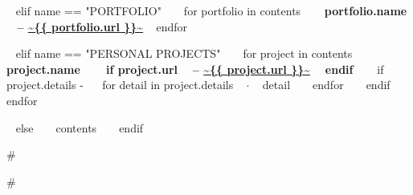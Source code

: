 \begin{minipage}{\textwidth}

~{ elif name == "PORTFOLIO" }~
  ~{ for portfolio in contents }~
    {\bf ~{{ portfolio.name }}~ -- \color{maincolor}\url{~{{ portfolio.url }}~} }
    \vspace{1mm}
  ~{ endfor }~
  \vspace{5mm}


~{ elif name == "PERSONAL PROJECTS" }~
  ~{ for project in contents }~
    {\small\bf ~{{ project.name }}~ ~{ if project.url }~ -- \color{maincolor}\url{~{{ project.url }}~} ~{ endif }~ }
    \vspace{1mm}
    ~{ if project.details -}~
    ~{ for detail in project.details }~
      $\cdot$ \small ~{{ detail }}~
    ~{ endfor }~
    ~{ endif }~
    \vspace{3mm}
  ~{ endfor }~
  \vspace{15mm}


\vspace{10mm}
~{ else }~
  ~{{ contents }}~
  \bigskip
~{ endif }~
\end{minipage}



{#

    
#}


